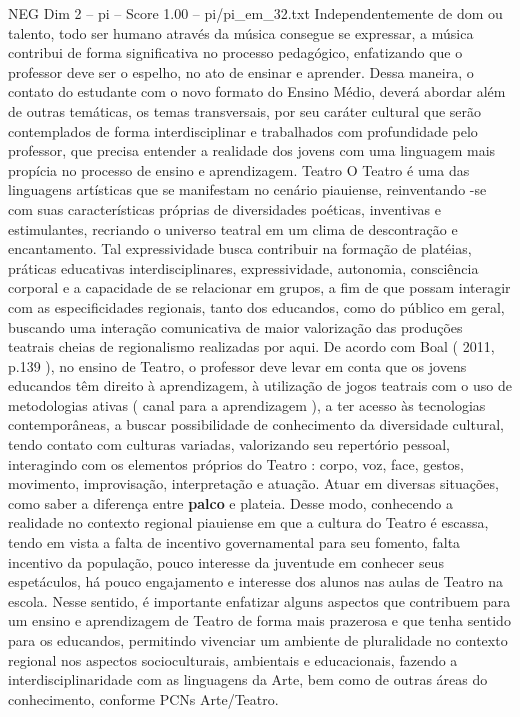 \begin{textsample}{NEG Dim 2 – pi – Score 1.00 – pi/pi\_em\_32.txt}
Independentemente de dom ou talento, todo ser humano através da música consegue se expressar, a música contribui de forma significativa no processo pedagógico, enfatizando que o professor deve ser o espelho, no ato de ensinar e aprender.
Dessa maneira, o contato do estudante com o novo formato do Ensino Médio, deverá abordar além de outras temáticas, os temas transversais, por seu caráter cultural que serão contemplados de forma interdisciplinar e trabalhados com profundidade pelo professor, que precisa entender a realidade dos jovens com uma linguagem mais propícia no processo de ensino e aprendizagem.
Teatro O Teatro é uma das linguagens artísticas que se manifestam no cenário piauiense, reinventando -se com suas características próprias de diversidades poéticas, inventivas e estimulantes, recriando o universo teatral em um clima de descontração e encantamento.
Tal expressividade busca contribuir na formação de platéias, práticas educativas interdisciplinares, expressividade, autonomia, consciência corporal e a capacidade de se relacionar em grupos, a fim de que possam interagir com as especificidades regionais, tanto dos educandos, como do público em geral, buscando uma interação comunicativa de maior valorização das produções teatrais cheias de regionalismo realizadas por aqui.
De acordo com Boal ( 2011, p.139 ), no ensino de Teatro, o professor deve levar em conta que os jovens educandos têm direito à aprendizagem, à utilização de jogos teatrais com o uso de metodologias ativas ( canal para a aprendizagem ), a ter acesso às tecnologias contemporâneas, a buscar possibilidade de conhecimento da diversidade cultural, tendo contato com culturas variadas, valorizando seu repertório pessoal, interagindo com os elementos próprios do Teatro : corpo, voz, face, gestos, movimento, improvisação, interpretação e atuação.
Atuar em diversas situações, como saber a diferença entre \textbf{palco} e plateia.
Desse modo, conhecendo a realidade no contexto regional piauiense em que a cultura do Teatro é escassa, tendo em vista a falta de incentivo governamental para seu fomento, falta incentivo da população, pouco interesse da juventude em conhecer seus espetáculos, há pouco engajamento e interesse dos alunos nas aulas de Teatro na escola.
Nesse sentido, é importante enfatizar alguns aspectos que contribuem para um ensino e aprendizagem de Teatro de forma mais prazerosa e que tenha sentido para os educandos, permitindo vivenciar um ambiente de pluralidade no contexto regional nos aspectos socioculturais, ambientais e educacionais, fazendo a interdisciplinaridade com as linguagens da Arte, bem como de outras áreas do conhecimento, conforme PCNs Arte/Teatro.

\end{textsample}
